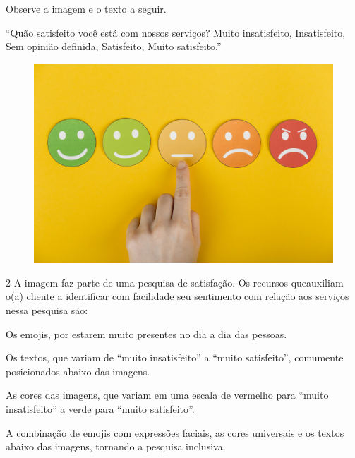 
Observe a imagem e o texto a seguir.


\begin{myquote}
``Quão satisfeito você está com nossos serviços? Muito insatisfeito,
Insatisfeito, Sem opinião definida, Satisfeito, Muito satisfeito.'' 
\begin{figure}[H]
\centering\includegraphics[width=\textwidth]{./imgSAEB_6_POR/freepik/PORT_6_IMG-6.jpeg}
\end{figure}
\end{myquote}
\num{2} A imagem faz parte de uma pesquisa de satisfação. Os recursos queauxiliam o(a) cliente a identificar com facilidade seu sentimento com
relação aos serviços nessa pesquisa são:

\begin{escolha}
\item Os emojis, por estarem muito presentes no dia a dia das pessoas.
\item Os textos, que variam de ``muito insatisfeito'' a ``muito
satisfeito'', comumente posicionados abaixo das imagens.
\item As cores das imagens, que variam em uma escala de vermelho para
``muito insatisfeito'' a verde para ``muito satisfeito''.
\item A combinação de emojis com expressões faciais, as cores universais e
os textos abaixo das imagens, tornando a pesquisa inclusiva.
\end{escolha}

